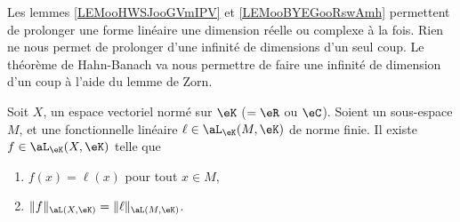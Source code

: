 Les lemmes \ref{LEMooHWSJooGVmIPV} et \ref{LEMooBYEGooRswAmh} permettent de prolonger une forme linéaire une dimension réelle ou complexe à la fois. Rien ne nous permet de prolonger d'une infinité de dimensions d'un seul coup. Le théorème de Hahn-Banach va nous permettre de faire une infinité de dimension d'un coup à l'aide du lemme de Zorn.

\begin{theorem}        \label{THOooTZSSooBKfxXE}
    Soit \( X\), un espace vectoriel normé sur \( \eK\) (\(=\eR\) ou \( \eC\)). Soient un sous-espace \( M\), et une fonctionnelle linéaire \( \ell\in\aL_{\eK}(M,\eK)\) de norme finie. Il existe \( f\in\aL_{\eK}(X,\eK)\) telle que
    \begin{enumerate}
        \item
              \( f(x)=\ell(x)\) pour tout \( x\in M\),
        \item
              \( \| f \|_{\aL(X,\eK)}=\| \ell \|_{\aL(M,\eK)}\).
    \end{enumerate}
\end{theorem}

